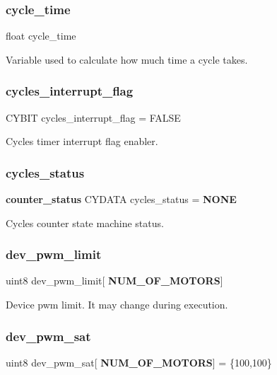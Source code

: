 \subsubsection{cycle\+\_\+time}
{\footnotesize\ttfamily float cycle\+\_\+time}

Variable used to calculate how much time a cycle takes. \mbox{\label{globals_8c_a9c58c534e60c7991a92a13d012e7ef86}} 
\subsubsection{cycles\+\_\+interrupt\+\_\+flag}
{\footnotesize\ttfamily C\+Y\+B\+IT cycles\+\_\+interrupt\+\_\+flag = F\+A\+L\+SE}

Cycles timer interrupt flag enabler. \mbox{\label{globals_8c_a9087b28d15f17c6475922ba6943b14f3}} 
\subsubsection{cycles\+\_\+status}
{\footnotesize\ttfamily \textbf{ counter\+\_\+status} C\+Y\+D\+A\+TA cycles\+\_\+status = \textbf{ N\+O\+NE}}

Cycles counter state machine status. \mbox{\label{globals_8c_ac7fdc35fc8e87ead9b45028d6034fb1b}} 
\subsubsection{dev\+\_\+pwm\+\_\+limit}
{\footnotesize\ttfamily uint8 dev\+\_\+pwm\+\_\+limit[\textbf{ N\+U\+M\+\_\+\+O\+F\+\_\+\+M\+O\+T\+O\+RS}]}

Device pwm limit. It may change during execution. \mbox{\label{globals_8c_a2e254e60f92958e2fdec99dde626dca6}} 
\subsubsection{dev\+\_\+pwm\+\_\+sat}
{\footnotesize\ttfamily uint8 dev\+\_\+pwm\+\_\+sat[\textbf{ N\+U\+M\+\_\+\+O\+F\+\_\+\+M\+O\+T\+O\+RS}] = \{100,100\}}

